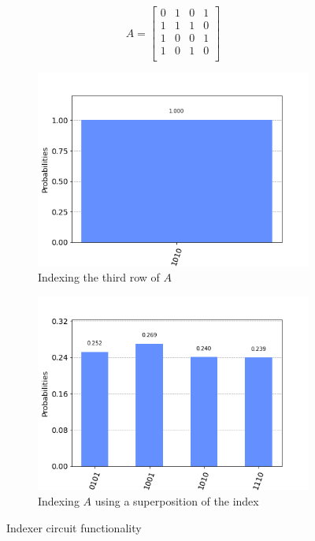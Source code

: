 \documentclass[10pt]{proc}
\theoremstyle{definition}
\theoremstyle{remark}
\begin{document}
\begin{figure}[!ht]
  \centering
  \begin{minipage}[b]{0.45\textwidth}
    \begin{equation*}
      A = \begin{bmatrix}%
        0 & 1 & 0 & 1 \\
        1 & 1 & 1 & 0 \\
        1 & 0 & 0 & 1 \\
        1 & 0 & 1 & 0 \\
      \end{bmatrix}
    \end{equation*}
  \end{minipage}

  \begin{subfigure}[b]{0.3\textwidth}
    \centering
    \includegraphics[width=\textwidth]{results/indexer_third_row.png} 
    \caption{Indexing the third row of $A$}
  \end{subfigure}
  \begin{subfigure}[b]{0.3\textwidth}
    \centering
    \includegraphics[width=\textwidth]{results/indexer_superposition.png} 
    \caption{Indexing $A$ using a superposition of the index}
  \end{subfigure}

  \caption{Indexer circuit functionality}
  \label{fig:indexer_func}
\end{figure}
\end{document}
